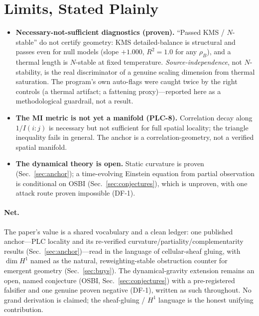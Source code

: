 \documentclass[aps,pra,twocolumn,superscriptaddress,floatfix]{revtex4-2}
\theoremstyle{definition}
\begin{document}
\section{Limits, Stated Plainly}
\label{sec:limits}

\begin{itemize}
\item \textbf{Necessary-not-sufficient diagnostics (proven).} ``Passed KMS /
$N$-stable'' do not certify geometry: KMS detailed-balance is structural and
passes even for null models (slope $+1.000$, $R^2=1.0$ for any $\rho_B$), and a
thermal length is $N$-stable at fixed temperature. \emph{Source-independence},
not $N$-stability, is the real discriminator of a genuine scaling dimension from
thermal saturation. The program's own auto-flags were caught twice by the right
controls (a thermal artifact; a fattening proxy)---reported here as a
methodological guardrail, not a result.
\item \textbf{The MI metric is not yet a manifold (PLC-8).} Correlation decay
along $1/I(i{:}j)$ is necessary but not sufficient for full spatial locality; the
triangle inequality fails in general. The anchor is a correlation-geometry, not
a verified spatial manifold.
\item \textbf{The dynamical theory is open.} Static curvature is proven
(Sec.~\ref{sec:anchor}); a time-evolving Einstein equation from partial
observation is conditional on OSBI (Sec.~\ref{sec:conjectures}), which is
unproven, with one attack route proven impossible (DF-1).
\end{itemize}

\paragraph{Net.}
The paper's value is a shared vocabulary and a clean ledger: one published
anchor---PLC locality and its re-verified curvature/partiality/complementarity
results (Sec.~\ref{sec:anchor})---read in the language of cellular-sheaf gluing,
with $\dim H^1$ named as the natural, reweighting-stable obstruction counter for
emergent geometry (Sec.~\ref{sec:buys}). The dynamical-gravity extension remains
an open, named conjecture (OSBI, Sec.~\ref{sec:conjectures}) with a
pre-registered falsifier and one genuine proven negative (DF-1), written as such
throughout. No grand derivation is claimed; the sheaf-gluing / $H^1$ language is
the honest unifying contribution.
\end{document}

